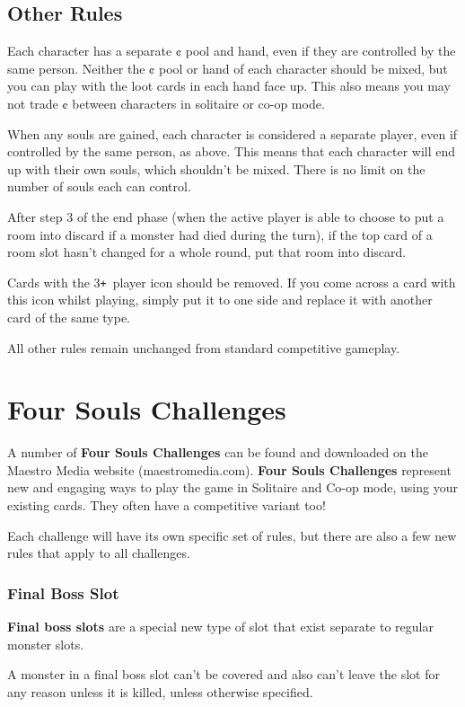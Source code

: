 \documentclass[a4paper, twoside]{report} %
\def\plus{\texttt{+}}
\begin{document}
    \section{Other Rules}
    Each character has a separate ¢ pool and hand, even if they are controlled by the same person. Neither the ¢ pool or hand of each character should be mixed, but you can play with the loot cards in each hand face up. This also means you may not trade ¢ between characters in solitaire or co-op mode.

    When any souls are gained, each character is considered a separate player, even if controlled by the same person, as above. This means that each character will end up with their own souls, which shouldn’t be mixed. There is no limit on the number of souls each can control.

    After step 3 of the end phase (when the active player is able to choose to put a room into discard if a monster had died during the turn), if the top card of a room slot hasn’t changed for a whole round, put that room into discard.

    Cards with the 3\plus\ player icon should be removed. If you come across a card with this icon whilst playing, simply put it to one side and replace it with another card of the same type.

    All other rules remain unchanged from standard competitive gameplay.

    \chapter{Four Souls Challenges}
    A number of \textbf{Four Souls Challenges} can be found and downloaded on the Maestro Media website (maestromedia.com). \textbf{Four Souls Challenges} represent new and engaging ways to play the game in Solitaire and Co-op mode, using your existing cards. They often have a competitive variant too!

    Each challenge will have its own specific set of rules, but there are also a few new rules that apply to all challenges.

    \subsection*{Final Boss Slot}
    \textbf{Final boss slots} are a special new type of slot that exist separate to regular monster slots.

    A monster in a final boss slot can’t be covered and also can’t leave the slot for any reason unless it is killed, unless otherwise specified.
\end{document}
